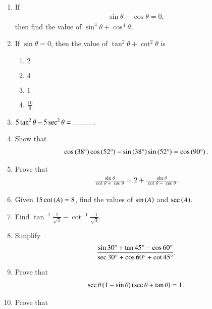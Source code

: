 \begin{enumerate}[label=\thesubsection.\arabic*,ref=\thesubsection.\theenumi,itemsep=1pt]
   \hfill{}\item If
   \begin{align*}
       \sin\theta-\cos\theta=0
   ,\end{align*}
   then find the value of $\sin^4\theta+\cos^4\theta$.
  \hfill{}
    \item If $\sin \theta=0$, then the value of $\tan^2\theta+\cot^2\theta$ is
    \begin{multicols}{4}
\begin{enumerate}
        \item $2$
        \item $4$
        \item $1$
        \item $\frac{10}{9}$
    \end{enumerate}
\end{multicols}
    \hfill{}\item $5\tan^2 \theta - 5\sec^2\theta = \rule{1cm}{0.1pt}$.
   \hfill{}\item Show that 
    \begin{align*}
        \cos\left(38\degree\right) \cos\left(52\degree\right) - \sin\left(38\degree\right)\sin\left(52\degree\right) = \cos\left(90\degree\right).
    \end{align*}
    \hfill{}\item Prove that 
    \begin{align*}
        \frac{\sin\theta}{\cot\theta+\csc\theta} = 2+\frac{\sin\theta}{\cot\theta-\csc\theta}.
    \end{align*}
    \hfill{}\item Given 
        $15 \cot \left(A\right) = 8$,
    find the values of $\sin \left(A\right)$ and $\sec \left(A\right)$.
    \hfill{}
\item Find $\tan^{-1}\frac{1}{\sqrt{3}} - \cot^{-1}\frac{-1}{\sqrt{3}}$.
    \hfill{}
\item  Simplify 
\begin{align*}
\frac{\sin 30\degree + \tan 45\degree-\cos 60\degree}{\sec 30\degree + \cos 60\degree + \cot 45\degree} 
.\end{align*}
\hfill{}\item Prove that 
\begin{align*}
 \sec \theta \left(1-\sin\theta\right)\left(\sec\theta+ \tan\theta\right)=1
.\end{align*}
\hfill{}\item Prove that 
\begin{align*}

\end{align*}
\end{enumerate}
